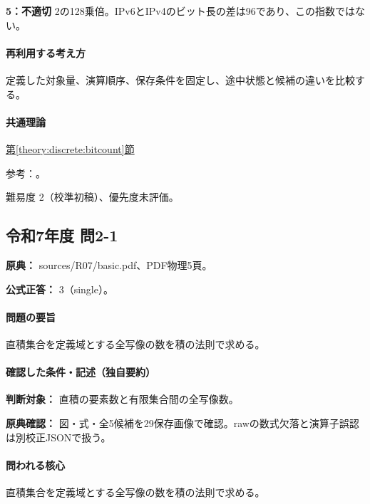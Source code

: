 \noindent\textbf{5：不適切} 2の128乗倍。IPv6とIPv4のビット長の差は96であり、この指数ではない。\par

\paragraph{再利用する考え方} 定義した対象量、演算順序、保存条件を固定し、途中状態と候補の違いを比較する。

\paragraph{共通理論} \hyperref[theory:discrete:bitcount]{第\ref*{theory:discrete:bitcount}節}

\par 参考：\cite{rfc4291_addresses}。

\par 難易度 2（校準初稿）、優先度未評価。

\subsection{令和7年度 問2-1}
\label{q:r07-reg-basic-2-1}

\noindent\textbf{原典：} sources/R07/basic.pdf、PDF物理5頁。

\textbf{公式正答：} 3（single）。

\paragraph{問題の要旨} 直積集合を定義域とする全写像の数を積の法則で求める。

\paragraph{確認した条件・記述（独自要約）}\mbox{}\par

\noindent\textbf{判断対象：} 直積の要素数と有限集合間の全写像数。\par

\noindent\textbf{原典確認：} 図・式・全5候補を29保存画像で確認。rawの数式欠落と演算子誤認は別校正JSONで扱う。\par

\paragraph{問われる核心} 直積集合を定義域とする全写像の数を積の法則で求める。

